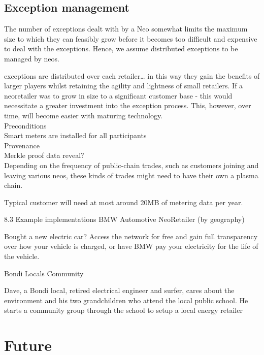\documentclass{article}
\theoremstyle{definition}
\theoremstyle{plain} %
\begin{document}
\subsection{Exception management}

\noindent The number of exceptions dealt with by a Neo somewhat limits the maximum size to which they can feasibly grow before it becomes too difficult and expensive to deal with the exceptions. Hence, we assume distributed exceptions to be managed by neos.

exceptions are distributed over each retailer… in this way they gain the benefits of larger players whilst retaining the agility and lightness of small retailers. If a neoretailer was to grow in size to a significant customer base - this would necessitate a greater investment into the exception process. This, however, over time, will become easier with maturing technology.\\

Preconditions\\

Smart meters are installed for all participants\\

Provenance\\

Merkle proof data reveal?\\


Depending on the frequency of public-chain trades, such as customers joining and leaving various neos, these kinds of trades might need to have their own a plasma chain.


Typical customer will need at most around 20MB of metering data per year.

8.3 Example implementations
BMW Automotive NeoRetailer (by geography)

Bought a new electric car? Access the network for free and gain full transparency over how your vehicle is charged, or have BMW pay your electricity for the life of the vehicle.


Bondi Locals Community

Dave, a Bondi local, retired electrical engineer and surfer, cares about the environment and his two grandchildren who attend the local public school. He starts a community group through the school to setup a local energy retailer 





\pagebreak
\section{Future}
\end{document}

